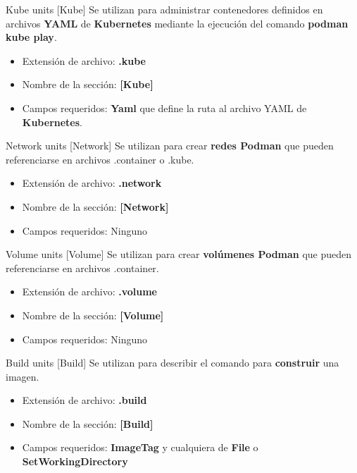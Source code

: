 \begin{frame}[c]{Kube units [Kube]}
  Se utilizan para administrar contenedores definidos en archivos
  \textbf{YAML} de \textbf{Kubernetes} mediante la ejecución del
  comando \textbf{podman kube play}.
  \begin{itemize}
    \item Extensión de archivo: \textbf{.kube}
    \item Nombre de la sección: \textbf{[Kube]}
    \item Campos requeridos: \textbf{Yaml} que define la ruta al
      archivo YAML de \textbf{Kubernetes}.
  \end{itemize}
\end{frame}

\begin{frame}[c]{Network units [Network]}
  Se utilizan para crear \textbf{redes Podman} que pueden referenciarse en
  archivos .container o .kube.
  \begin{itemize}
    \item Extensión de archivo: \textbf{.network}
    \item Nombre de la sección: \textbf{[Network]}
    \item Campos requeridos: Ninguno
  \end{itemize}
\end{frame}

\begin{frame}[c]{Volume units [Volume]}
  Se utilizan para crear \textbf{volúmenes Podman} que pueden
  referenciarse en archivos .container.
  \begin{itemize}
    \item Extensión de archivo: \textbf{.volume}
    \item Nombre de la sección: \textbf{[Volume]}
    \item Campos requeridos: Ninguno
  \end{itemize}
\end{frame}

\begin{frame}[c]{Build units [Build]}
  Se utilizan para describir el comando para \textbf{construir}
  una imagen.
  \begin{itemize}
    \item Extensión de archivo: \textbf{.build}
    \item Nombre de la sección: \textbf{[Build]}
    \item Campos requeridos: \textbf{ImageTag} y cualquiera de
      \textbf{File} o \textbf{SetWorkingDirectory}
  \end{itemize}
\end{frame}

